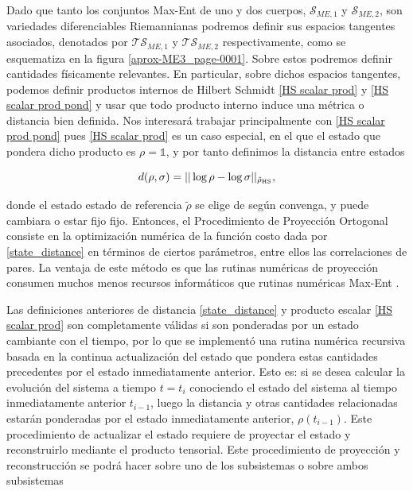 \documentclass{report} %
\numberwithin{equation}{section}
\begin{document}
Dado que tanto los conjuntos Max-Ent de uno y dos cuerpos, $\mathcal{S}_{ME,1}$ y $\mathcal{S}_{ME,2}$, son variedades diferenciables Riemannianas podremos definir sus espacios tangentes asociados, denotados por $\mathcal{TS}_{ME,1}$ y $\mathcal{TS}_{ME,2}$ respectivamente, como se esquematiza en la figura \ref{aprox-ME3_page-0001}. Sobre estos podremos definir cantidades físicamente relevantes. En particular, sobre dichos espacios tangentes, podemos definir  productos internos de Hilbert Schmidt \eqref{HS scalar prod} y \eqref{HS scalar prod pond} y usar que todo producto interno induce una métrica o distancia bien definida. Nos interesará trabajar principalmente con \eqref{HS scalar prod pond} pues \eqref{HS scalar prod} es un caso especial, en el que el estado que pondera dicho producto  es $\rho = \mathds{1}$, y por tanto definimos la distancia entre estados

\begin{equation}
    d(\rho,\sigma) =   ||\log\rho-\log\sigma||_{\tilde{\rho}_{\textnormal{HS}}}
    , \label{state_distance}
\end{equation}

\noindent donde el estado estado de referencia $\tilde{\rho}$ se elige de según convenga, y puede cambiara o estar fijo fijo. Entonces, el Procedimiento de Proyección Ortogonal consiste en la optimización numérica de la función costo dada por \eqref{state_distance} en términos de ciertos parámetros, entre ellos las correlaciones de pares. La ventaja de este método es que las rutinas numéricas de proyección consumen muchos menos recursos informáticos que rutinas numéricas Max-Ent .

Las definiciones anteriores de distancia \eqref{state_distance} y producto escalar \eqref{HS scalar prod} son completamente válidas si son ponderadas por un estado cambiante con el tiempo, por lo que se implementó una rutina numérica recursiva basada en la continua actualización del estado que pondera estas cantidades precedentes por el estado inmediatamente anterior. Esto es: si se desea calcular la evolución del sistema a tiempo $t=t_i$ conociendo el estado del sistema al tiempo inmediatamente anterior $t_{i-1}$, luego la distancia y otras cantidades relacionadas estarán ponderadas por el estado inmediatamente anterior, $\rho(t_{i-1})$. Este procedimiento de actualizar el estado requiere de proyectar el estado y reconstruirlo mediante el producto tensorial. Este procedimiento de proyección y reconstrucción se podrá hacer sobre uno de los subsistemas o sobre ambos subsistemas \\
\end{document}
